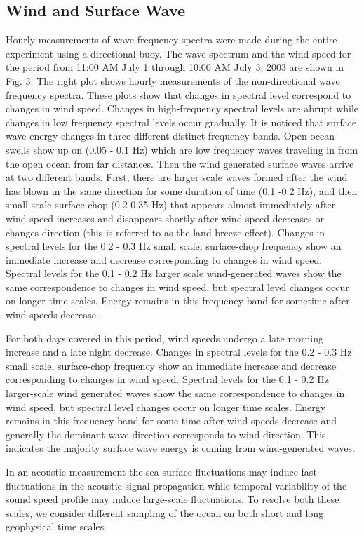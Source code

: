 \subsection{Wind and Surface Wave}
Hourly measurements of wave frequency spectra were made during the
entire experiment using a directional buoy. The wave spectrum and
the wind speed for the period from 11:00 AM July 1 through 10:00 AM
July 3, 2003 are shown in Fig. 3. The right plot shows hourly
measurements of the non-directional wave frequency spectra.  These
plots show that changes in spectral level correspond to changes in
wind speed.   Changes in high-frequency spectral levels are abrupt
while changes in low frequency spectral levels occur gradually. It
is noticed that surface wave energy changes in three different
distinct frequency bands. Open ocean swells show up on (0.05 - 0.1
Hz) which are low frequency waves traveling in from the open ocean
from far distances. Then the wind generated surface waves arrive at
two different bands. First, there are larger scale waves formed
after the wind has blown in the same direction for some duration of
time (0.1 -0.2 Hz), and then small scale surface chop (0.2-0.35 Hz)
that appears almost immediately after wind speed increases and
disappears shortly after wind speed decreases or changes direction
(this is referred to as the land breeze effect). Changes in spectral
levels for the 0.2 - 0.3 Hz small scale, surface-chop frequency show
an immediate increase and decrease corresponding to changes in wind
speed.  Spectral levels for the 0.1 - 0.2 Hz larger scale
wind-generated waves show the same correspondence to changes in wind
speed, but spectral level changes occur on longer time scales.
Energy remains in this frequency band for sometime after wind speeds
decrease.

For both days covered in this period, wind speeds undergo a late
morning increase and a late night decrease.  Changes in spectral
levels for the 0.2 - 0.3 Hz small scale, surface-chop frequency show
an immediate increase and decrease corresponding to changes in wind
speed.  Spectral levels for the 0.1 - 0.2 Hz larger-scale wind
generated waves show the same correspondence to changes in wind
speed, but spectral level changes occur on longer time scales.
Energy remains in this frequency band for some time after wind
speeds decrease and generally the dominant wave direction
corresponds to wind direction. This indicates the majority surface
wave energy is coming from wind-generated waves.

In an acoustic measurement the sea-surface fluctuations may induce
fast fluctuations in the acoustic signal propagation while temporal
variability of the sound speed profile may induce large-scale
fluctuations. To resolve both these scales, we consider different
sampling of the ocean on both short and long geophysical time
scales.

